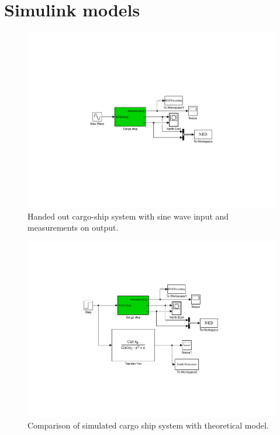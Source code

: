 \clearpage
\section{Simulink models}\label{sec:simulink}

\begin{figure}[!htb]
	\centering
	\includegraphics[trim=200 200 200 200, clip, width=\textwidth]{figures/models/p5p1b_c_model.pdf}
	\caption{Handed out cargo-ship system with sine wave input and measurements on output.}
\label{fig:p5p1b_c_model}
\end{figure}

\begin{figure}[!htb]
	\centering
	\includegraphics[trim=150 150 150 125, clip, width=\textwidth]{figures/models/p5p1d_model.pdf}
	\caption{Comparison of simulated cargo ship system with theoretical model.}
\label{fig:p5p1d_model}
\end{figure}

